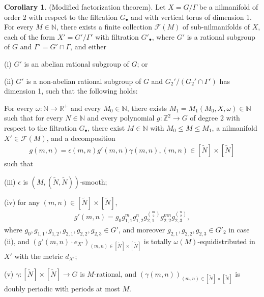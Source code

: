 \documentclass[12pt,amstex]{amsart}
\theoremstyle{definition}
\newtheorem{cor}[thm]{Corollary}
\def \e {\epsilon}
\begin{document}
\begin{cor}\label{mF}(Modified factorization theorem).
  Let $X=G/\Gamma$ be a nilmanifold of order 2 with respect to the filtration $G_{\bullet}$ and with vertical torus of dimension 1. For every $M\in\mathbb{N}$, there exists a finite collection $\mathcal{F}(M)$ of sub-nilmanifolds of $X$, each of the form $X'=G'/\Gamma'$ with filtration $G'_{\bullet}$, where $G'$ is a rational subgroup of $G$ and $\Gamma'=G'\cap\Gamma$, and either

  (i) $G'$ is an abelian rational subgroup of $G$; or

  (ii) $G'$ is a non-abelian rational subgroup of $G$ and $G_{2}'/(G_{2}'\cap\Gamma')$ has dimension 1, such that the following holds:

  For every $\omega\colon\mathbb{N}\rightarrow\mathbb{R}^{+}$ and every $M_{0}\in\mathbb{N}$, there exists $M_{1}=M_{1}(M_{0},X,\omega)\in\mathbb{N}$ such that for every $N\in\mathbb{N}$ and every polynomial $g\colon\mathbb{Z}^{2}\rightarrow G$ of degree 2 with respect to the filtration $G_{\bullet}$, there exist $M\in\mathbb{N}$ with $M_{0}\leq M\leq M_{1}$, a nilmanifold $X'\in\mathcal{F}(M)$, and a decomposition
\begin{equation}\nonumber
  \begin{split}
  g(m,n)=\e(m,n)g'(m,n)\gamma(m,n), (m,n)\in[\tilde{N}]\times[\tilde{N}]
  \end{split}
\end{equation}
such that

(iii) $\e$ is $(M,(\tilde{N},\tilde{N}))$-smooth;

(iv) for any $(m,n)\in[\tilde{N}]\times[\tilde{N}]$,
\begin{equation}\nonumber
  \begin{split}
  g'(m,n)=g_{0}g_{1,1}^{m}g_{1,2}^{n}g_{2,1}^{\binom{m}{2}}g_{2,2}^{mn}g_{2,3}^{\binom{n}{2}},
  \end{split}
\end{equation}
where $g_{0}, g_{1,1}, g_{1,2},g_{2,1},g_{2,2},g_{2,3}\in G'$, and moreover $g_{2,1},g_{2,2},g_{2,3}\in G'_{2}$ in case (ii), and $(g'(m,n)\cdot e_{X'})_{(m,n)\in[\tilde{N}]\times[\tilde{N}]}$ is totally $\omega(M)$-equidistributed in $X'$ with the metric $d_{X'}$;

(v) $\gamma\colon[\tilde{N}]\times[\tilde{N}]\rightarrow G$ is $M$-rational, and $(\gamma(m,n))_{(m,n)\in[\tilde{N}]\times[\tilde{N}]}$ is doubly periodic with periods at most $M$.
\end{cor}
\end{document}
